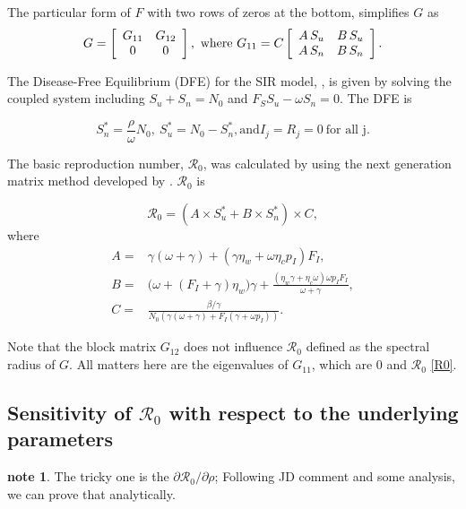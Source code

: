 \documentclass[12pt]{article}
\newcommand{\Rnum}{\mathcal{R}_0}
\theoremstyle{definition} %
\newtheorem{note}{note}
\begin{document}
The particular form of $F$ with two rows of zeros at the bottom, simplifies $G$ as
\begin{equation}
G = \left[ \begin {array}{cc}
G_{11}&G_{12}\\
0&0
\end {array} \right], \text{ where } \\
G_{11} =C
\left[\begin {array}{cc}
A\,S_u & B\,S_u\\
A\,S_n & B\,S_n
\end {array}\right].
\end{equation}

The Disease-Free Equilibrium (DFE) for the SIR model, , is given by solving the coupled system including $S_u+S_n=N_0$ and $F_S S_u-\omega S_n=0$. The DFE is

\begin{equation}
\label{dfe}
S_n^*= \frac{\rho}{\omega} N_0, \ S_u^*= N_0-S_n^*, \text{and} I_j=R_j=0 \ \text{for all j}.
\end{equation}

The basic reproduction number, $\Rnum$, was calculated by using the next generation matrix method developed by \cite{van2002reproduction}. $\Rnum$ is

\begin{equation}
\label{R0}
\Rnum= (A \times S_u^* + B \times S_n^*) \times C,
\end{equation}
where
\begin{align*}
A=& \gamma(\omega+\gamma) + (\gamma \eta_w + \omega \eta_c p_I) F_I, \\
B=& \big(\omega+(F_I+\gamma)\eta_w\big) \gamma+\frac{(\eta_w \gamma+ \eta_c\omega) \omega p_I F_I }{\omega+\gamma}, \\
C=& \frac{\beta/\gamma}{N_0 (\gamma(\omega+\gamma)+F_I(\gamma+\omega p_I))}.
\end{align*}

Note that the block matrix $G_{12}$ does not influence $\Rnum$ defined as the spectral radius of $G$. All matters here are the eigenvalues of $G_{11}$, which are 0 and $\Rnum$ \eqref{R0}.
% 
\subsection{Sensitivity of $\Rnum$ with respect to the underlying parameters}

\begin{note} The tricky one is the $\partial{\Rnum}/\partial{\rho}$; Following JD comment and some analysis, we can prove that analytically.
\end{note}
\end{document}
